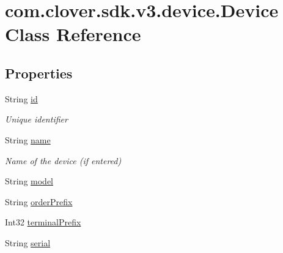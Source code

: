 \hypertarget{classcom_1_1clover_1_1sdk_1_1v3_1_1device_1_1_device}{}\section{com.\+clover.\+sdk.\+v3.\+device.\+Device Class Reference}
\label{classcom_1_1clover_1_1sdk_1_1v3_1_1device_1_1_device}
\subsection*{Properties}
\begin{DoxyCompactItemize}
\item 
String \hyperlink{classcom_1_1clover_1_1sdk_1_1v3_1_1device_1_1_device_a7761d81a6f1d36b03d8470a891f5b770}{id}
\begin{DoxyCompactList}\small\item\em Unique identifier \end{DoxyCompactList}\item 
String \hyperlink{classcom_1_1clover_1_1sdk_1_1v3_1_1device_1_1_device_a139990e0d2f93f390e3f4954fb3bd4d9}{name}
\begin{DoxyCompactList}\small\item\em Name of the device (if entered) \end{DoxyCompactList}\item 
String \hyperlink{classcom_1_1clover_1_1sdk_1_1v3_1_1device_1_1_device_aff3bc368e4273c75480116f67b176da2}{model}
\item 
String \hyperlink{classcom_1_1clover_1_1sdk_1_1v3_1_1device_1_1_device_a68f555035f958e442ca7d3481b48e5c0}{order\+Prefix}
\item 
Int32 \hyperlink{classcom_1_1clover_1_1sdk_1_1v3_1_1device_1_1_device_a1bdda2f082c1908ea74c3b120e3e961f}{terminal\+Prefix}
\item 
String \hyperlink{classcom_1_1clover_1_1sdk_1_1v3_1_1device_1_1_device_a598dd63abe45a84f9055146e4640467c}{serial}

\end{DoxyCompactItemize}

